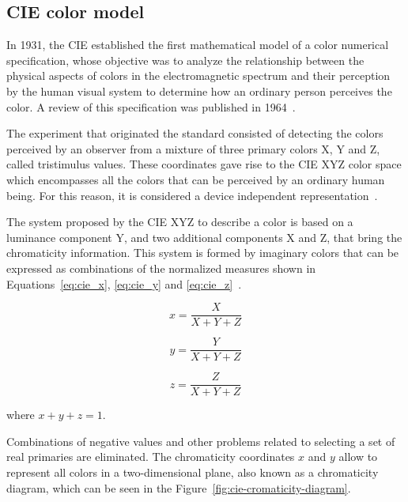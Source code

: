 \subsection{CIE color model}
\label{sec:modelo_cores_cie}

In 1931, the CIE established the first mathematical model of a color numerical specification, whose objective was to analyze the relationship between the physical aspects of colors in the electromagnetic spectrum and their perception by the human visual system to determine how an ordinary person perceives the color. A review of this specification was published in 1964~\citep{gonzalez:02}.

The experiment that originated the standard consisted of detecting the colors perceived by an observer from a mixture of three primary colors X, Y and Z, called tristimulus values. These coordinates gave rise to the CIE XYZ color space which encompasses all the colors that can be perceived by an ordinary human being. For this reason, it is considered a device independent representation~\citep{konstantinos:00}.

The system proposed by the CIE XYZ to describe a color is based on a luminance component Y, and two additional components X and Z, that bring the chromaticity information. This system is formed by imaginary colors that can be expressed as combinations of the normalized measures shown in Equations~\ref{eq:cie_x}, \ref{eq:cie_y} and \ref{eq:cie_z}~\citep{konstantinos:00}.

\newpage
\begin{equation}
  x = \frac{X}{X + Y + Z}
\label{eq:cie_x}
\end{equation}

\begin{equation}
  y = \frac{Y}{X + Y + Z}
\label{eq:cie_y}
\end{equation}

\begin{equation}
  z = \frac{Z}{X + Y + Z}
\label{eq:cie_z}
\end{equation}

where $x + y+ z = 1$.

Combinations of negative values and other problems related to selecting a set of real primaries are eliminated. The chromaticity coordinates $x$ and $y$ allow to represent all colors in a two-dimensional plane, also known as a chromaticity diagram, which can be seen in the Figure~\ref{fig:cie-cromaticity-diagram}.

